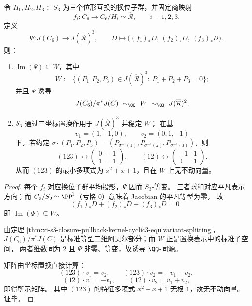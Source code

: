 \begin{proposition}\label{prop:xi-s3-closure-standard-isotypic-explicit-r3-realization}
令 \(H_1,H_2,H_3\subset S_3\) 为三个位形互换的换位子群，并固定商映射
\[
f_i:C_6\to C_6/H_i\simeq \overline{\mathcal R},\qquad i=1,2,3.
\]
定义
\[
\Psi:J(C_6)\longrightarrow J(\overline{\mathcal R})^3,\qquad
D\longmapsto \bigl((f_1)_*D,\ (f_2)_*D,\ (f_3)_*D\bigr).
\]
则：
\begin{enumerate}
  \item \(\operatorname{Im}(\Psi)\subseteq W\)，其中
  \[
  W:=\{(P_1,P_2,P_3)\in J(\overline{\mathcal R})^3:\ P_1+P_2+P_3=0\};
  \]
  并且 \(\Psi\) 诱导
  \[
  J(C_6)/\pi^\ast J(C)\ \sim_{\QQ}\ W\ \sim_{\QQ}\ J(\overline{\mathcal R})^2.
  \]
  \item \(S_3\) 通过三坐标置换作用于 \(J(\overline{\mathcal R})^3\) 并稳定 \(W\)；
  在基
  \[
  v_1=(1,-1,0),\qquad v_2=(0,1,-1)
  \]
  下，若约定
  \(
  \sigma\cdot(P_1,P_2,P_3)=(P_{\sigma^{-1}(1)},P_{\sigma^{-1}(2)},P_{\sigma^{-1}(3)})
  \)，则
  \[
  (123)\longleftrightarrow
  \begin{pmatrix}
  0 & -1\\
  1 & -1
  \end{pmatrix},
  \qquad
  (12)\longleftrightarrow
  \begin{pmatrix}
  -1 & 1\\
  0 & 1
  \end{pmatrix}.
  \]
  从而 \((123)\) 的最小多项式为 \(x^2+x+1\)，且在 \(W\) 上无不动向量。
\end{enumerate}
\end{proposition}

\begin{proof}
每个 \(f_i\) 对应换位子群平均投影，\(\Psi\) 因而 \(S_3\)-等变。
三者求和对应平凡表示方向；而 \(C_6/S_3\simeq\PP^1\)（亏格 \(0\)）意味着 Jacobian 的平凡等型为零，
故
\[
(f_1)_*D+(f_2)_*D+(f_3)_*D=0,
\]
即 \(\operatorname{Im}(\Psi)\subseteq W\)。

由定理 \ref{thm:xi-s3-closure-pullback-kernel-cyclic3-equivariant-splitting}，
\(
J(C_6)/\pi^\ast J(C)
\)
是标准等型二维阿贝尔部分；而 \(W\) 正是置换表示中的标准子空间，
两者维数同为 \(2\) 且 \(\Psi\) 非零、等变，故诱导 \(\QQ\)-同源。

矩阵由坐标置换直接计算：
\[
(123)\cdot v_1=v_2,\qquad
(123)\cdot v_2=-v_1-v_2,
\]
\[
(12)\cdot v_1=-v_1,\qquad
(12)\cdot v_2=v_1+v_2,
\]
即得所示矩阵。
其中 \((123)\) 的特征多项式 \(x^2+x+1\) 无根 \(1\)，故无不动向量。证毕。
\end{proof}



\endinput
